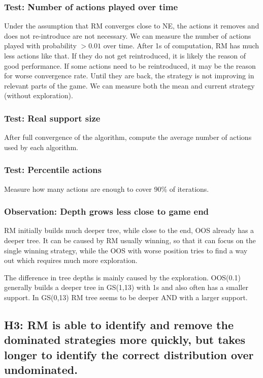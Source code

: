 \documentclass[preprint,12pt]{elsarticle}
\begin{document}
\subsubsection{Test: Number of actions played over time}

Under the assumption that RM converges close to NE, the actions it removes and does not re-introduce are not necessary. We can measure the number of actions played with probability $>0.01$ over time. After 1s of computation, RM has much less actions like that. If they do not get reintroduced, it is likely the reason of good performance. If some actions need to be reintroduced, it may be the reason for worse convergence rate. Until they are back, the strategy is not improving in relevant parts of the game. We can measure both the mean and current strategy (without exploration).

\subsubsection{Test: Real support size}

After full convergence of the algorithm, compute the average number of actions used by each algorithm.

\subsubsection{Test: Percentile actions}

Measure how many actions are enough to cover 90\% of iterations.

\subsubsection{Observation: Depth grows less close to game end}

RM initially builds much deeper tree, while close to the end, OOS already has a deeper tree. It can be caused by RM usually winning, so that it can focus on the single winning strategy, while the OOS with worse position tries to find a way out which requires much more exploration.

The difference in tree depths is mainly caused by the exploration. OOS(0.1) generally builds a deeper tree in GS(1,13) with 1s and also often has a smaller support. In GS(0,13) RM tree seems to be deeper AND with a larger support.


\subsection{H3: RM is able to identify and remove the dominated strategies more quickly, but takes longer to identify the correct distribution over undominated.}
\end{document}
